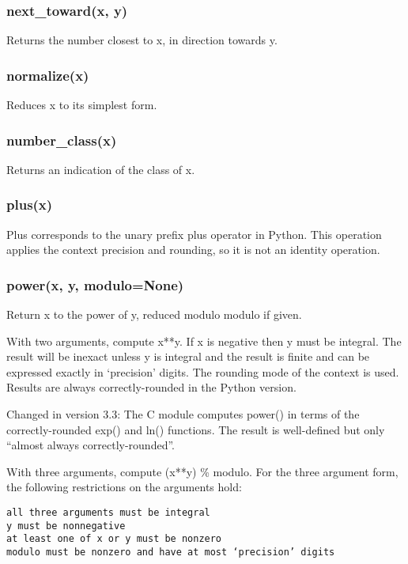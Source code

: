 \subsubsection{next\_toward(x, y)}

Returns the number closest to x, in direction towards y.

\subsubsection{normalize(x)}

Reduces x to its simplest form.

\subsubsection{number\_class(x)}

Returns an indication of the class of x.

\subsubsection{plus(x)}

Plus corresponds to the unary prefix plus operator in Python. This operation applies the context precision and rounding, so it is not an identity operation.

\subsubsection{power(x, y, modulo=None)}

Return x to the power of y, reduced modulo modulo if given.

With two arguments, compute x**y. If x is negative then y must be integral. The result will be inexact unless y is integral and the result is finite and can be expressed exactly in ‘precision’ digits. The rounding mode of the context is used. Results are always correctly-rounded in the Python version.


Changed in version 3.3: The C module computes power() in terms of the correctly-rounded exp() and ln() functions. The result is well-defined but only “almost always correctly-rounded”.

With three arguments, compute (x**y) \% modulo. For the three argument form, the following restrictions on the arguments hold:

\begin{lstlisting}
all three arguments must be integral
y must be nonnegative
at least one of x or y must be nonzero
modulo must be nonzero and have at most ‘precision’ digits
\end{lstlisting}

